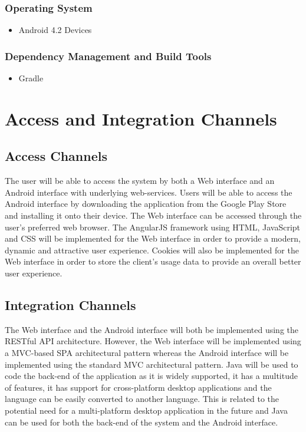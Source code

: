 \documentclass[a4paper,10pt]{article}
\begin{document}
\subsubsection{Operating System}
	\begin{itemize}
		\item Android 4.2 Devices
	\end{itemize}

\subsubsection{Dependency Management and Build Tools}
	\begin{itemize}
		\item Gradle
	\end{itemize}

\section{Access and Integration Channels}
\subsection{Access Channels}
		The user will be able to access the system by both a Web interface and an Android interface with underlying web-services. Users will be able to access the Android interface by downloading the application from the Google Play Store and installing it onto their device. The Web interface can be accessed through the user’s preferred web browser. The AngularJS framework using HTML, JavaScript and CSS will be implemented for the Web interface in order to provide a modern, dynamic and attractive user experience. Cookies will also be implemented for the Web interface in order to store the client’s usage data to provide an overall better user experience.
	
\subsection{Integration Channels}
		The Web interface and the Android interface will both be implemented using the RESTful API architecture. However, the Web interface will be implemented using a MVC-based SPA architectural pattern whereas the Android interface will be implemented using the standard MVC architectural pattern. Java will be used to code the back-end of the application as it is widely supported, it has a multitude of features, it has support for cross-platform desktop applications and the language can be easily converted to another language. This is related to the potential need for a multi-platform desktop application in the future and Java can be used for both the back-end of the system and the Android interface.
		
\end{document}
